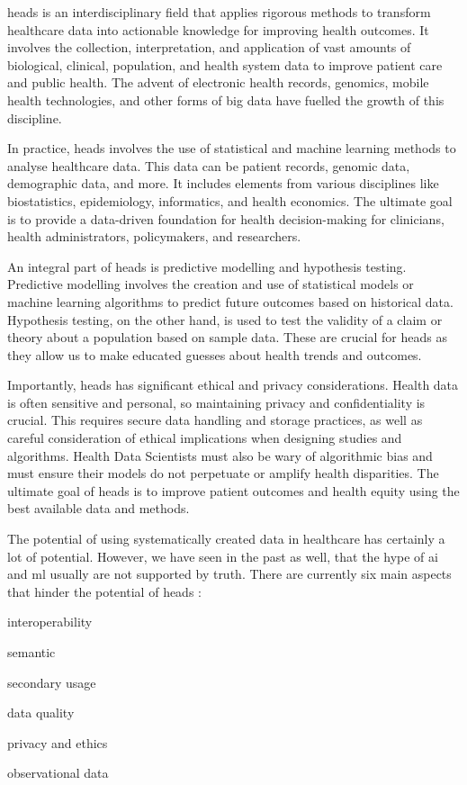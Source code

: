 \ac{heads} is an interdisciplinary field that applies rigorous methods to transform healthcare data into actionable knowledge for improving health outcomes. It involves the collection, interpretation, and application of vast amounts of biological, clinical, population, and health system data to improve patient care and public health. The advent of electronic health records, genomics, mobile health technologies, and other forms of big data have fuelled the growth of this discipline.

In practice, \ac{heads} involves the use of statistical and machine learning methods to analyse healthcare data. This data can be patient records, genomic data, demographic data, and more. It includes elements from various disciplines like biostatistics, epidemiology, informatics, and health economics. The ultimate goal is to provide a data-driven foundation for health decision-making for clinicians, health administrators, policymakers, and researchers.

An integral part of \ac{heads} is predictive modelling and hypothesis testing. Predictive modelling involves the creation and use of statistical models or machine learning algorithms to predict future outcomes based on historical data. Hypothesis testing, on the other hand, is used to test the validity of a claim or theory about a population based on sample data. These are crucial for \ac{heads} as they allow us to make educated guesses about health trends and outcomes.

Importantly, \ac{heads} has significant ethical and privacy considerations. Health data is often sensitive and personal, so maintaining privacy and confidentiality is crucial. This requires secure data handling and storage practices, as well as careful consideration of ethical implications when designing studies and algorithms. Health Data Scientists must also be wary of algorithmic bias and must ensure their models do not perpetuate or amplify health disparities. The ultimate goal of \ac{heads} is to improve patient outcomes and health equity using the best available data and methods.


The potential of using systematically created data in healthcare has certainly a lot of potential. However, we have seen in the past as well, that the hype of \ac{ai} and \ac{ml} usually are not supported by truth. There are currently six main aspects that hinder the potential of \ac{heads} \cite{panchInconvenientTruthAI2019,peekThreeControversiesHealth2018}:
\begin{myitemize}
    \item interoperability
    \item semantic
    \item secondary usage
    \item data quality
    \item privacy and ethics
    \item observational data
\end{myitemize}

